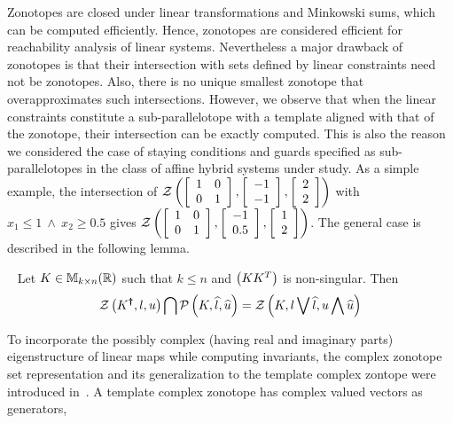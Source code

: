 Zonotopes are closed under linear transformations and Minkowski sums, which can be computed efficiently.  Hence, zonotopes are
considered efficient for reachability analysis of linear systems.  Nevertheless
a major drawback of zonotopes is that their intersection with sets defined by linear
constraints need not be zonotopes.  Also, there is no unique smallest
zonotope that overapproximates such intersections.  However, we observe that when the linear constraints
constitute a sub-parallelotope with a template aligned with that of
the zonotope, their intersection can be exactly computed.  This is
also the reason we considered the case of staying conditions and guards specified as sub-parallelotopes 
in the class of affine hybrid systems under study.  As a simple example, the intersection of
$\mathcal{Z}\left(\left[\begin{array}{l l}1 & 0 \\ 0 &
      1\end{array}\right],\left[\begin{array}{c}-1\\ -1\end{array}\right],\left[\begin{array}{c}2\\ 2\end{array}\right]\right)$
with $x_1\leq 1~\wedge~x_2\geq 0.5$ gives $\mathcal{Z}\left(\left[\begin{array}{l
        l}1 & 0 \\ 0 &
      1\end{array}\right],\left[\begin{array}{c}-1\\ 0.5\end{array}\right],\left[\begin{array}{c}1\\ 2\end{array}\right]\right)$.
The general case is described in the following lemma.
%
\begin{lemma}~\label{lem:motivation}
Let $K\in\mathbb{M}_{k\times n}(\mathbb{R})$ such that $k\leq n$ and $\left(KK^T\right)$ is
non-singular.  Then
\[
\mathcal{Z}\left(K^{\bm{\dagger}},l,u\right) \bigcap \mathcal{P}\left(K,\widehat{l},\widehat{u}\right)
= \mathcal{Z}\left(K,l\bigvee \widehat{l},u\bigwedge \widehat{u}\right)
\]
\end{lemma}
%
To incorporate the possibly complex (having real and imaginary parts)
eigenstructure of linear maps while computing invariants, the complex
zonotope set representation and its generalization to the template
complex zontope were introduced in~\cite{adimoolam2016using,tcz2017}.
A template complex zonotope has complex valued vectors as generators,
